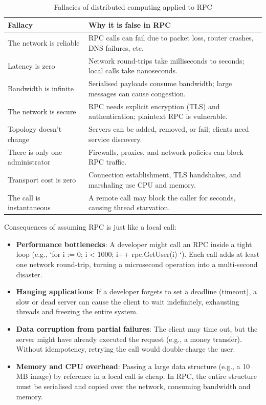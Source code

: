 \documentclass[10pt,a4paper]{article}
\begin{document}
\begin{table}[H]
\centering
\begin{tabular}{|p{4cm}|p{9cm}|}
\hline
\textbf{Fallacy} & \textbf{Why it is false in RPC} \\
\hline
The network is reliable & RPC calls can fail due to packet loss, router crashes, DNS failures, etc. \\
Latency is zero & Network round-trips take milliseconds to seconds; local calls take nanoseconds. \\
Bandwidth is infinite & Serialised payloads consume bandwidth; large messages can cause congestion. \\
The network is secure & RPC needs explicit encryption (TLS) and authentication; plaintext RPC is vulnerable. \\
Topology doesn’t change & Servers can be added, removed, or fail; clients need service discovery. \\
There is only one administrator & Firewalls, proxies, and network policies can block RPC traffic. \\
Transport cost is zero & Connection establishment, TLS handshakes, and marshaling use CPU and memory. \\
The call is instantaneous & A remote call may block the caller for seconds, causing thread starvation. \\
\hline
\end{tabular}
\caption{Fallacies of distributed computing applied to RPC}
\end{table}

Consequences of assuming RPC is just like a local call:

\begin{itemize}
    \item \textbf{Performance bottlenecks}: A developer might call an RPC inside a tight loop (e.g., `for i := 0; i < 1000; i++ { rpc.GetUser(i) }`). Each call adds at least one network round-trip, turning a microsecond operation into a multi-second disaster.
    \item \textbf{Hanging applications}: If a developer forgets to set a deadline (timeout), a slow or dead server can cause the client to wait indefinitely, exhausting threads and freezing the entire system.
    \item \textbf{Data corruption from partial failures}: The client may time out, but the server might have already executed the request (e.g., a money transfer). Without idempotency, retrying the call would double-charge the user.
    \item \textbf{Memory and CPU overhead}: Passing a large data structure (e.g., a 10 MB image) by reference in a local call is cheap. In RPC, the entire structure must be serialised and copied over the network, consuming bandwidth and memory.
\end{itemize}
\end{document}
